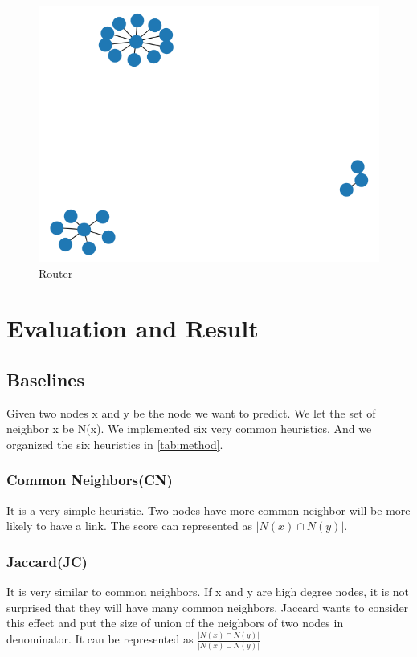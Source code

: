 \documentclass[12pt]{article}
\begin{document}
\begin{figure}[h]
	\centering
	\includegraphics[scale=0.3]{Router}
	\caption{Router}
	\label{fig:Router}
\end{figure}
\section{Evaluation and Result}

\subsection{Baselines}
Given two nodes x and y be the node we want to predict. We let the set of neighbor x be N(x). We implemented six very common heuristics. And we organized the six heuristics in \ref{tab:method}. \\
\subsubsection{Common Neighbors(CN)}
It is a very simple heuristic. Two nodes have more common neighbor will be more likely to have a link. The score can represented as $|N(x) \cap N(y)|$.
\subsubsection{Jaccard(JC)}
It is very similar to common neighbors. If x and y are high degree nodes, it is not surprised that they will have many common neighbors. Jaccard wants to consider this effect and put the size of union of the neighbors of two nodes in denominator. It can be represented as $\frac{|N(x) \cap N(y)|}{|N(x) \cup N(y)|}$
\end{document}

